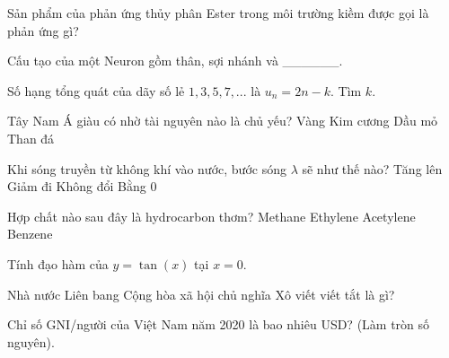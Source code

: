 \begin{ex}
    Sản phẩm của phản ứng thủy phân Ester trong môi trường kiềm được gọi là phản ứng gì?

\end{ex}

\begin{ex}
    Cấu tạo của một Neuron gồm thân, sợi nhánh và ______.

\end{ex}

\begin{ex}
    Số hạng tổng quát của dãy số lẻ $1, 3, 5, 7, ...$ là $u_n = 2n - k$. Tìm $k$.
\end{ex}

\begin{ex}
    Tây Nam Á giàu có nhờ tài nguyên nào là chủ yếu?
    \choice
    {Vàng}
    {Kim cương}
    {\True Dầu mỏ}
    {Than đá}
\end{ex}

\begin{ex}
    Khi sóng truyền từ không khí vào nước, bước sóng $\lambda$ sẽ như thế nào?
    \choice
    {\True Tăng lên}
    {Giảm đi}
    {Không đổi}
    {Bằng 0}
\end{ex}

\begin{ex}
    Hợp chất nào sau đây là hydrocarbon thơm?
    \choice
    {Methane}
    {Ethylene}
    {Acetylene}
    {\True Benzene}
\end{ex}

\begin{ex}
    Tính đạo hàm của $y = \tan(x)$ tại $x=0$.
\end{ex}

\begin{ex}
    Nhà nước Liên bang Cộng hòa xã hội chủ nghĩa Xô viết viết tắt là gì?
\end{ex}

\begin{ex}
    Chỉ số GNI/người của Việt Nam năm 2020 là bao nhiêu USD? (Làm tròn số nguyên).
\end{ex}

